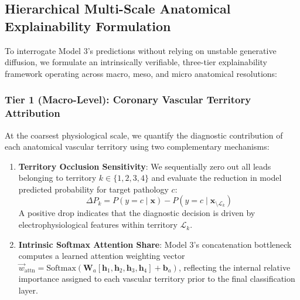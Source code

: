 \documentclass[5p,twocolumn,10pt]{elsarticle}
\begin{document}
\subsection{Hierarchical Multi-Scale Anatomical Explainability Formulation}
To interrogate Model 3's predictions without relying on unstable generative diffusion, we formulate an intrinsically verifiable, three-tier explainability framework operating across macro, meso, and micro anatomical resolutions:

\subsubsection{Tier 1 (Macro-Level): Coronary Vascular Territory Attribution}
At the coarsest physiological scale, we quantify the diagnostic contribution of each anatomical vascular territory using two complementary mechanisms:
\begin{enumerate}
    \item \textbf{Territory Occlusion Sensitivity}: We sequentially zero out all leads belonging to territory $k \in \{1, 2, 3, 4\}$ and evaluate the reduction in model predicted probability for target pathology $c$:
    \begin{equation}
    \Delta P_k = P(y = c \mid \mathbf{x}) - P(y = c \mid \mathbf{x}_{\setminus \mathcal{L}_k})
    \end{equation}
    A positive drop indicates that the diagnostic decision is driven by electrophysiological features within territory $\mathcal{L}_k$.
    \item \textbf{Intrinsic Softmax Attention Share}: Model 3's concatenation bottleneck computes a learned attention weighting vector $\vec{w}_{\text{attn}} = \text{Softmax}(\mathbf{W}_a [\mathbf{h}_1, \mathbf{h}_2, \mathbf{h}_3, \mathbf{h}_4] + \mathbf{b}_a)$, reflecting the internal relative importance assigned to each vascular territory prior to the final classification layer.
\end{enumerate}
\end{document}
